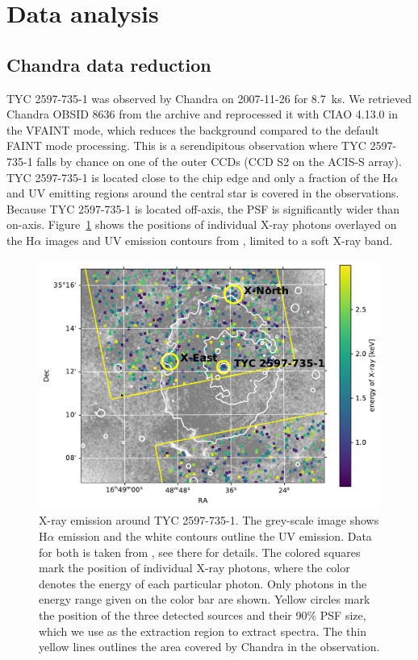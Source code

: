 \documentclass[linenumbers]{aastex631}
\begin{document}
\section{Data analysis} \label{sec:data}
\subsection{Chandra data reduction}
TYC 2597-735-1 was observed by Chandra on 2007-11-26 for 8.7~ks.
We retrieved Chandra OBSID 8636 from  the archive and reprocessed it with CIAO 4.13.0 \citep{2006SPIE.6270E..1VF} in the VFAINT mode, which reduces the background compared to the default FAINT mode processing. This is a serendipitous observation where TYC 2597-735-1 falls by chance on one of the outer CCDs (CCD S2 on the ACIS-S array). TYC 2597-735-1 is located close to the chip edge and only a fraction of the H$\alpha$ and UV emitting regions around the central star is covered in the observations. Because TYC 2597-735-1 is located off-axis, the PSF is significantly wider than on-axis. Figure~\ref{fig:chandraimage} shows the positions of individual X-ray photons overlayed on the H$\alpha$ images and UV emission contours from \citet{2020Natur.587..387H}, limited to a soft X-ray band.
\begin{figure}
    \centering
    \includegraphics[width=\textwidth]{figures/chandraimage.pdf}
    \caption{X-ray emission around TYC 2597-735-1. The grey-scale image shows H$\alpha$ emission and the white contours outline the UV emission. Data for both is taken from \citet{2020Natur.587..387H}, see there for details. The colored squares mark the position of individual X-ray photons, where the color denotes the energy of each particular photon. Only photons in the energy range given on the color bar are shown. Yellow circles mark the position of the three detected sources and their 90\% PSF size, which we use as the extraction region to extract spectra. The thin yellow lines outlines the area covered by Chandra in the observation.}
    \label{fig:chandraimage}
\end{figure}
\end{document}
